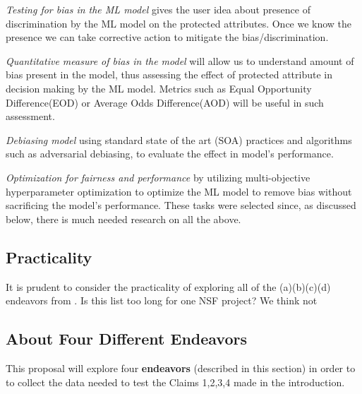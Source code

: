 \bi
\item[(a)] {\em Testing for bias in the ML model}
gives the user idea about presence of discrimination by the ML model on the protected attributes. Once we know the presence we can take corrective action to mitigate the bias/discrimination.
\item[(b)]  {\em Quantitative measure of bias in the model } will allow us to understand amount of bias present in the model, thus assessing the effect of protected attribute in decision making by the ML model. Metrics such as Equal   Opportunity   Difference(EOD) or Average Odds Difference(AOD) will be useful in such assessment.
\item [(c)] {\em Debiasing model }
using standard state of the art (SOA) practices and algorithms such as adversarial debiasing, to evaluate the effect in model's performance.
\item[(d)] {\em Optimization for fairness and performance} by utilizing multi-objective hyperparameter optimization to optimize the ML model to remove bias without sacrificing the model's performance. 
\ei
These tasks were selected since, as discussed below, there is much needed research on all the above.
 
 \subsection{Practicality}\label{tion:practical}

It is prudent to consider the practicality of exploring
all of the (a)(b)(c)(d) endeavors from . Is this list too long for
one NSF project? We think not 



\subsection{About Four Different Endeavors}\label{tion:four}
This proposal will explore  four
{\bf endeavors} (described in this section)
in order to 
to collect the data needed to test the  Claims 1,2,3,4 made in the introduction. 


